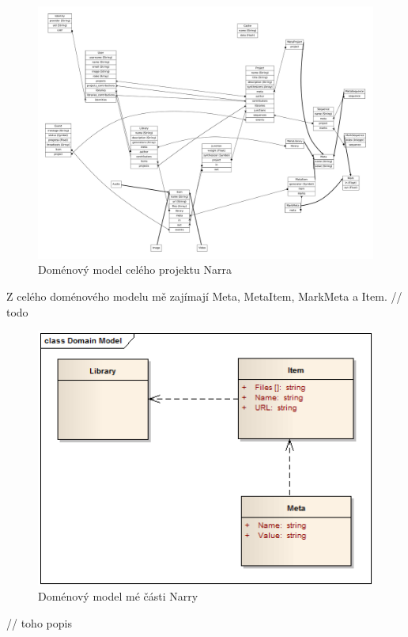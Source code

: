 \begin{figure}[H]
\includegraphics[width=1\textwidth]{./obrazova_priloha/domain_full.pdf}
\caption{Doménový model celého projektu Narra}
\end{figure}

\par Z celého doménového modelu mě zajímají Meta, MetaItem, MarkMeta a Item.
// todo

\begin{figure}[H]
\includegraphics[width=1\textwidth]{./obrazova_priloha/domain_my.png}
\caption{Doménový model mé části Narry}
\end{figure}
\par // toho popis
